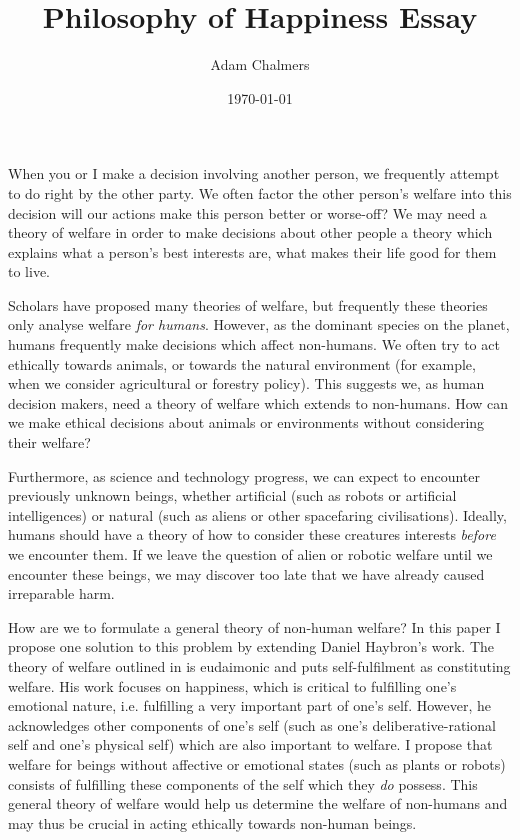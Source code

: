 \documentclass{article}
\title{Philosophy of Happiness Essay}
\author{Adam Chalmers}
\date{\today}
\begin{document}
\frenchspacing
\onehalfspacing
\maketitle


When you or I make a decision involving another person, we frequently attempt to do right by the other party. We often factor the other person's welfare into this decision \textemdash{} will our actions make this person better or worse-off? We may need a theory of welfare in order to make decisions about other people \textemdash{} a theory which explains what a person's best interests are, what makes their life good for them to live.

Scholars have proposed many theories of welfare, but frequently these theories only analyse welfare \textit{for humans}. However, as the dominant species on the planet, humans frequently make decisions which affect non-humans. We often try to act ethically towards animals, or towards the natural environment (for example, when we consider agricultural or forestry policy). This suggests we, as human decision makers, need a theory of welfare which extends to non-humans. How can we make ethical decisions about animals or environments without considering their welfare? 

Furthermore, as science and technology progress, we can expect to encounter previously unknown beings, whether artificial (such as robots or artificial intelligences) or natural (such as aliens or other spacefaring civilisations). Ideally, humans should have a theory of how to consider these creatures interests \textit{before} we encounter them. If we leave the question of alien or robotic welfare until we encounter these beings, we may discover too late that we have already caused irreparable harm.

How are we to formulate a general theory of non-human welfare? In this paper I propose one solution to this problem by extending Daniel Haybron's work. The theory of welfare outlined in \citet{haybron2008pursuit} is eudaimonic and puts self-fulfilment as constituting welfare. His work focuses on happiness, which is critical to fulfilling one's emotional nature, i.e. fulfilling a very important part of one's self. However, he acknowledges other components of one's self (such as one's deliberative-rational self and one's physical self) which are also important to welfare. I propose that welfare for beings without affective or emotional states (such as plants or robots) consists of fulfilling these components of the self which they \textit{do} possess. This general theory of welfare would help us determine the welfare of non-humans and may thus be crucial in acting ethically towards non-human beings.
\end{document}
